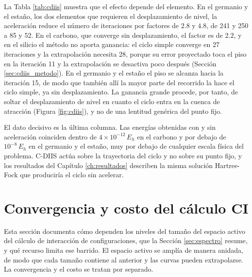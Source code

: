 \begin{table}[htbp]
    \centering
    
    \caption[Iteraciones del ciclo autoconsistente con y sin C-DIIS]{Iteraciones necesarias para alcanzar $|\Delta E| < 10^{-10}\,E_h$ con y sin C-DIIS, desde el mismo punto inicial y en el estado $^3P$. La última columna es la diferencia entre las dos energías convergidas.}
    \label{tab:cdiis}
\end{table}

La Tabla \ref{tab:cdiis} muestra que el efecto depende del elemento. En el germanio y el estaño, los dos elementos que requieren el desplazamiento de nivel, la aceleración reduce el número de iteraciones por factores de $2.8$ y $4.8$, de 241 y 250 a 85 y 52. En el carbono, que converge sin desplazamiento, el factor es de $2.2$, y en el silicio el método no aporta ganancia: el ciclo simple converge en 27 iteraciones y la extrapolación necesita 28, porque su error proyectado toca el piso en la iteración 11 y la extrapolación se desactiva poco después (Sección \ref{sec:cdiis_metodo}). En el germanio y el estaño el piso se alcanza hacia la iteración 15, de modo que también allí la mayor parte del recorrido la hace el ciclo simple, ya sin desplazamiento. La ganancia grande procede, por tanto, de soltar el desplazamiento de nivel en cuanto el ciclo entra en la cuenca de atracción (Figura \ref{fig:cdiis}), y no de una lentitud genérica del punto fijo.

El dato decisivo es la última columna. Las energías obtenidas con y sin aceleración coinciden dentro de $4\times10^{-12}\,E_h$ en el carbono y por debajo de $10^{-8}\,E_h$ en el germanio y el estaño, muy por debajo de cualquier escala física del problema. C-DIIS actúa sobre la trayectoria del ciclo y no sobre su punto fijo, y los resultados del Capítulo \ref{ch:resultados} describen la misma solución Hartree-Fock que produciría el ciclo sin acelerar.

\section{Convergencia y costo del cálculo CI}
\label{sec:costo_ci}

Esta sección documenta cómo dependen los niveles del tamaño del espacio activo del cálculo de interacción de configuraciones, que la Sección \ref{sec:espectro} resume, y qué recurso limita ese barrido. El espacio activo se amplía de manera anidada, de modo que cada tamaño contiene al anterior y las curvas pueden extrapolarse. La convergencia y el costo se tratan por separado.

